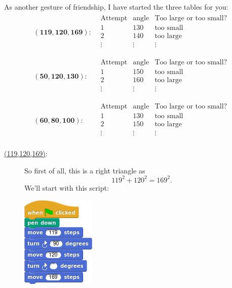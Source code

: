 \documentclass[noauthor,nooutcomes,handout,12pt]{ximera}
\begin{document}
\begin{question}
     As another gesture of friendship, I have started the three tables
     for you:
     \[
     \begin{array}{rl}
       \mathbf{(119,120,169):} &
        \begin{array}{|c|c|c|c|}\hline
       \text{Attempt} & \text{angle} & \text{Too large or too small?} \\ \hline\hline
       1 & 130 & \text{too small} \\ \hline
       2 & 140 & \text{too large}  \\ \hline
       \vdots & \vdots & \vdots  \\ 
        \end{array} \\
        & \\
          \mathbf{(50,120,130):} & \begin{array}{|c|c|c|c|}\hline
            \text{Attempt} & \text{angle} & \text{Too large or too small?} \\ \hline\hline
            1 & 150 & \text{too small} \\ \hline
            2 & 160 & \text{too large}  \\ \hline
            \vdots & \vdots & \vdots  \\ 
     \end{array} \\
     & \\
       \mathbf{(60,80,100):}  &
        \begin{array}{|c|c|c|c|}\hline
       \text{Attempt} & \text{angle} & \text{Too large or too small?} \\ \hline\hline
       1 & 130 & \text{too small} \\ \hline
       2 & 150 & \text{too large}  \\ \hline
       \vdots & \vdots & \vdots  \\ 
        \end{array}
     \end{array}
     \]
     \begin{freeResponse}
       \begin{description}
       \item[\underline{(119,120,169)}:] So first of all, this is a right
        triangle as
        \[
        119^2 + 120^2 =169^2.
        \]
        We'll start with this script:
        \begin{center}
          \includegraphics{basicScriptRightBlank.png}

\end{center}
\end{description}
\end{freeResponse}
\end{question}
\end{document}
